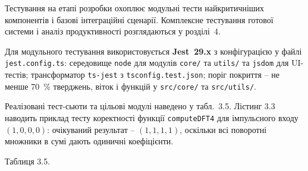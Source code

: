 \documentclass[
]{article}
\begin{document}
Тестування на етапі розробки охоплює модульні тести найкритичніших
компонентів і базові інтеграційні сценарії. Комплексне тестування
готової системи і аналіз продуктивності розглядаються у розділі~4.

Для модульного тестування використовується \textbf{Jest~29.x} з
конфігурацією у файлі \texttt{jest.config.ts}: середовище \texttt{node}
для модулів \texttt{core}\texttt{/} та \texttt{utils}\texttt{/} та
\texttt{jsdom} для UI-тестів; трансформатор \texttt{ts-jest} з
\texttt{tsconfig.test.json}; поріг покриття -- не менше 70~\% тверджень,
віток і функцій у \texttt{src}\texttt{/}\texttt{core}\texttt{/} та
\texttt{src}\texttt{/}\texttt{utils}\texttt{/}.

Реалізовані тест-сьюти та цільові модулі наведено у табл.~3.5. Лістинг
3.3 наводить приклад тесту коректності функції \texttt{computeDFT4} для
імпульсного входу \((1,0,0,0)\): очікуваний результат -- \((1,1,1,1)\),
оскільки всі поворотні множники в сумі дають одиничні коефіцієнти.

Таблиця 3.5.
\end{document}
